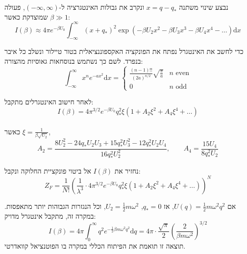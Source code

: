 \documentclass{tstextbook}
\begin{document}
\begin{proposition}
נבצע שינוי משתנה \(x = q - q_*\) ונקרב את גבולות האינטגרציה ל-\((-\infty, \infty)\), פעולה שמוצדקת כאשר \(\beta \gg 1\):\\
$$I(\beta) \approx 4\pi e^{ -\beta U_0 } \int_{-\infty}^{\infty} (x + q_*)^2 \exp \left( -\beta U_2 x^2 - \beta U_3 x^3 - \beta U_4 x^4 - \dots \right) \mathrm{d}x
$$

\end{proposition}
\begin{remark}
כדי לחשב את האינטגרל נפתח את הפונקציה האקספוננציאלית בטור טיילור ונשלב כל איבר בנפרד. לשם כך נשתמש בנוסחאות גאוסיות מהצורה:\\
$$\int_{-\infty}^{\infty} x^n e^{-a x^2} \mathrm{d}x =\begin{cases}\frac{(n-1)!!}{(2a)^{n/2}} \sqrt{ \frac{\pi}{a} } & n \text{ even} \\0 & n \text{ odd}\end{cases}
$$

\end{remark}
\begin{proposition}
לאחר חישוב האינטגרלים מתקבל:\\
$$I(\beta) = 4\pi^{3/2} e^{ -\beta U_0 } q_*^2 \xi \left( 1 + A_2 \xi^2 + A_4 \xi^4 + \dots \right)
$$\\

כאשר \(\xi = \frac{1}{\beta \sqrt{U_2}}\),
$$A_2 = \frac{8U_2^2 - 24q_*U_2 U_3 + 15q_*^2 U_3^2 - 12 q_*^2 U_2 U_4}{16 q_*^2 U_2^2}, \qquad A_4 = \frac{15 U_4}{8 q_*^2 U_2}
$$

\end{proposition}
\begin{definition}
נחזיר את \(I(\beta)\) אל ביטוי פונקציית החלוקה ונקבל:\\
$$Z_F = \frac{1}{N!} \left( \frac{1}{\lambda^3} \cdot 4\pi^{3/2} e^{ -\beta U_0 } q_*^2 \xi \left( 1 + A_2 \xi^2 + A_4 \xi^4 + \dots \right) \right)^N
$$

\end{definition}
\begin{example}
אם \(U(q) = \frac{1}{2} m \omega^2 q^2\), אז \(q_* = 0\), \(U_2 = \frac{1}{2} m \omega^2\), וכל הנגזרות הגבוהות יותר מתאפסות. במקרה זה, מתקבל אינטגרל מדויק:\\
$$I(\beta) = 4\pi \int_0^\infty q^2 e^{ -\frac{1}{2} \beta m \omega^2 q^2 } \mathrm{d}q = 4\pi \cdot \frac{\sqrt{\pi}}{2} \left( \frac{2}{\beta m \omega^2} \right)^{3/2}
$$
תוצאה זו תואמת את הפיתוח הכללי במקרה בו הפוטנציאל קוואדרטי.

\end{example}
\end{document}
